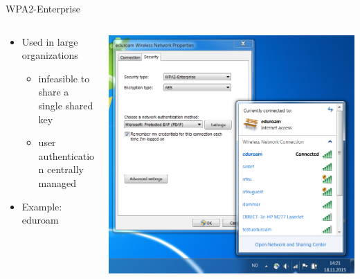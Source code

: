 \documentclass[xcolor={dvipsnames},screen, aspectratio=43,compress]{beamer}
\begin{document}
\begin{frame}{WPA2-Enterprise}
	 \begin{columns}
		 \begin{column}{.49\textwidth}
			\centering
			\begin{itemize}
				\item Used in large organizations 
				
				\begin{itemize}
				\item infeasible to share a single shared key
				
				\item user authentication centrally managed
				\end{itemize}
				
				\item Example: eduroam
				
			\end{itemize}
		\end{column}

		\begin{column}{.50\textwidth}
		   \includegraphics[width=\textwidth]{wireless}
		 \end{column}
	\end{columns}
\end{frame}

\end{document}
